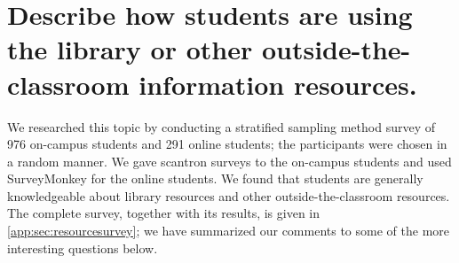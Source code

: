 



\section[Library and other outside-the-classroom information resources]{Describe how students are using the library or other
outside-the-classroom information resources.  }
We researched this topic by conducting a stratified sampling method
survey of 976 on-campus students and 291 online students; the participants were
chosen in a random manner.  We gave scantron surveys to the on-campus students
and used SurveyMonkey for the online students. We found that students are
generally knowledgeable about library resources and other outside-the-classroom
resources.  The complete survey, together with its results, is given in
\vref{app:sec:resourcesurvey}; we have summarized our comments to some of the 
more interesting questions below.

